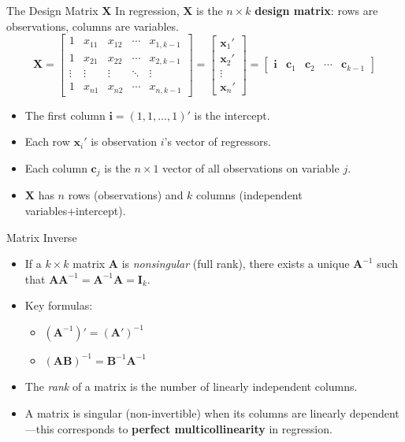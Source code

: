\documentclass[aspectratio=169, handout, t]{beamer}
\numberwithin{equation}{section}
\begin{document}
\begin{frame}{The Design Matrix $\bm{X}$}
In regression, $\bm{X}$ is the $n\times k$ \textbf{design matrix}: rows are observations, columns are variables.
$$\bm{X}=\begin{bmatrix}
1 & x_{11} & x_{12} & \cdots & x_{1,k-1}\\
1 & x_{21} & x_{22} & \cdots & x_{2,k-1}\\
\vdots & \vdots & \vdots & \ddots & \vdots\\
1 & x_{n1} & x_{n2} & \cdots & x_{n,k-1}
\end{bmatrix}
=\begin{bmatrix} \bm{x}_1' \\ \bm{x}_2' \\ \vdots \\ \bm{x}_n'\end{bmatrix}
=\begin{bmatrix} \bm{i} & \bm{c}_1 & \bm{c}_2 & \cdots & \bm{c}_{k-1}\end{bmatrix}$$\pause
\begin{itemize}
\item The first column $\bm{i}=(1,1,\ldots,1)'$ is the intercept.
\item Each row $\bm{x}_i'$ is observation $i$'s vector of regressors.
\item Each column $\bm{c}_j$ is the $n\times 1$ vector of all observations on variable $j$.
\item $\bm{X}$ has $n$ rows (observations) and $k$ columns (independent variables+intercept).
\end{itemize}
\end{frame}




\begin{frame}{Matrix Inverse}
\begin{itemize}
\item If a $k \times k$ matrix $\bm{A}$ is \emph{nonsingular} (full rank), there exists a unique $\bm{A}^{-1}$ such that $\bm{A}\bm{A}^{-1}=\bm{A}^{-1}\bm{A}=\bm{I}_k$.\pause
\item Key formulas:
\begin{itemize}
\item $(\bm{A}^{-1})'=(\bm{A}')^{-1}$
\item $(\bm{AB})^{-1}=\bm{B}^{-1}\bm{A}^{-1}$
\end{itemize}\pause
\item The \emph{rank} of a matrix is the number of linearly independent columns.
\item A matrix is singular (non-invertible) when its columns are linearly dependent---this corresponds to \textbf{perfect multicollinearity} in regression.
\end{itemize}
\end{frame}
\end{document}
